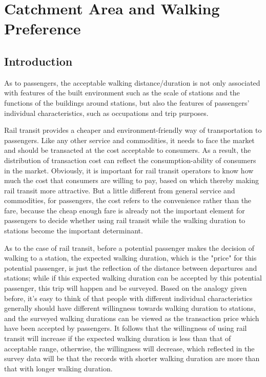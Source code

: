 \chapter{Catchment Area and Walking Preference}
%
\section{Introduction}
%
As to passengers, the acceptable walking distance/duration is not only associated with features of the built environment such as the scale of stations and the functions of the buildings around stations, but also the features of passengers' individual characteristics, such as occupations and trip purposes.

%
Rail transit provides a cheaper and environment-friendly way of transportation to passengers. Like any other service and commodities, it needs to face the market and should be transacted at the cost acceptable to consumers. As a result, the distribution of transaction cost can reflect the consumption-ability of consumers in the market. Obviously, it is important for rail transit operators to know how much the cost that consumers are willing to pay, based on which thereby making rail transit more attractive. But a little different from general service and commodities, for passengers, the cost refers to the convenience rather than the fare, because the cheap enough fare is already not the important element for passengers to decide whether using rail transit while the walking duration to stations become the important determinant.

%
As to the case of rail transit, before a potential passenger makes the decision of walking to a station, the expected walking duration, which is the "price" for this potential passenger, is just the reflection of the distance between departures and stations; while if this expected walking duration can be accepted by this potential passenger, this trip will happen and be surveyed. Based on the analogy given before, it's easy to think of that people with different individual characteristics generally should have different willingness towards walking duration to stations, and the surveyed walking durations can be viewed as the transaction price which have been accepted by passengers. It follows that the willingness of using rail transit will increase if the expected walking duration is less than that of acceptable range, otherwise, the willingness will decrease, which reflected in the survey data will be that the records with shorter walking duration are more than that with longer walking duration. 

